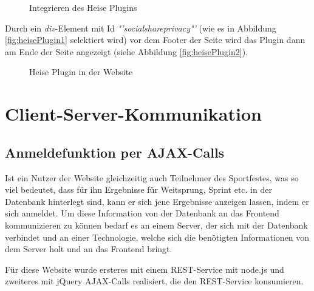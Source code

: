 \begin{figure}[!h]
	\caption{Integrieren des Heise Plugins}
	\label{fig:heisePlugin1}
\end{figure}

Durch ein \textit{div}-Element mit Id \textit{"'socialshareprivacy"'} (wie es in Abbildung \vref{fig:heisePlugin1} selektiert wird) vor dem Footer der Seite wird das Plugin dann am Ende der Seite angezeigt (siehe Abbildung \vref{fig:heisePlugin2}).

\begin{figure}[!h]
	\caption{Heise Plugin in der Website}
	\label{fig:heisePlugin2}
\end{figure}

\chapter{Client-Server-Kommunikation}
\label{Client-Server-Kommunikation}

\section{Anmeldefunktion per AJAX-Calls}
\label{Anmeldefunktion per AJAX-Calls}
Ist ein Nutzer der Website gleichzeitig auch Teilnehmer des Sportfestes, was so viel bedeutet, dass für ihn Ergebnisse für Weitsprung, Sprint etc. in der Datenbank hinterlegt sind, kann er sich jene Ergebnisse anzeigen lassen, indem er sich anmeldet. Um diese Information von der Datenbank an das Frontend kommunizieren zu können bedarf es an einem Server, der sich mit der Datenbank verbindet und an einer Technologie, welche sich die benötigten Informationen von dem Server holt und an das Frontend bringt. 
\par
Für diese Website wurde ersteres mit einem REST-Service mit node.js und zweiteres mit jQuery AJAX-Calls realisiert, die den REST-Service konsumieren.


